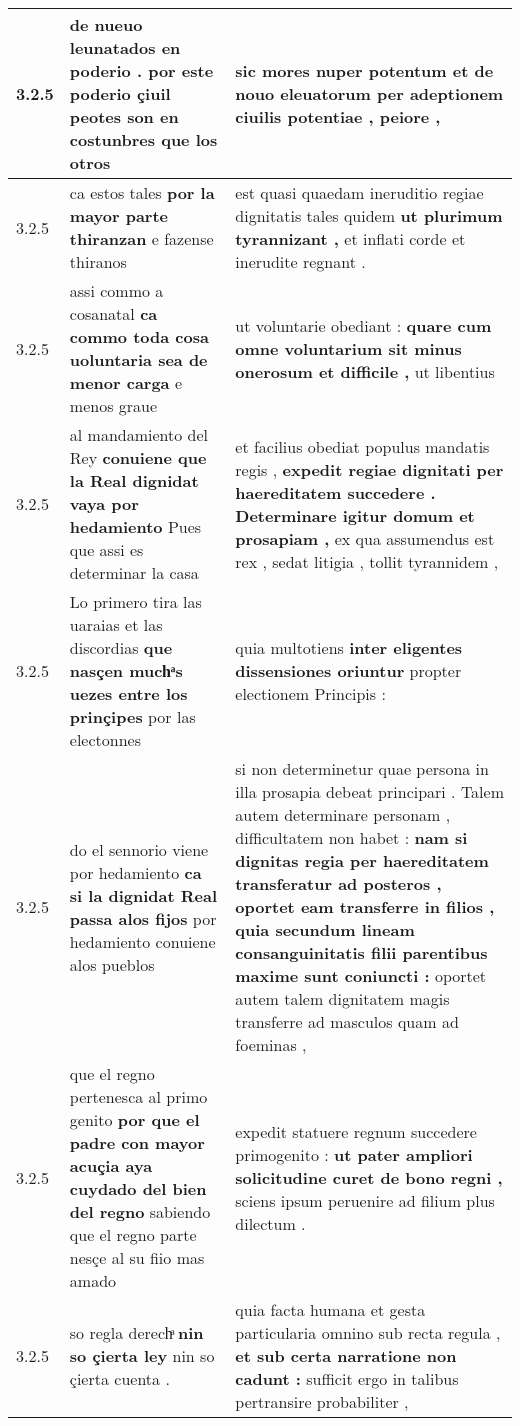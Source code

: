 \begin{tabular}{|p{1cm}|p{6.5cm}|p{6.5cm}|}
3.2.5 & de nueuo leunatados en poderio . \textbf{ por este poderio çiuil peotes son en costunbres } que los otros & sic mores nuper potentum \textbf{ et de nouo eleuatorum per adeptionem ciuilis potentiae , } peiore , \\\hline
3.2.5 & ca estos tales \textbf{ por la mayor parte thiranzan } e fazense thiranos & est quasi quaedam ineruditio regiae dignitatis tales quidem \textbf{ ut plurimum tyrannizant , } et inflati corde et inerudite regnant . \\\hline
3.2.5 & assi commo a cosanatal \textbf{ ca commo toda cosa uoluntaria sea de menor carga } e menos graue & ut voluntarie obediant : \textbf{ quare cum omne voluntarium sit minus onerosum et difficile , } ut libentius \\\hline
3.2.5 & al mandamiento del Rey \textbf{ conuiene que la Real dignidat vaya por hedamiento } Pues que assi es determinar la casa & et facilius obediat populus mandatis regis , \textbf{ expedit regiae dignitati per haereditatem succedere . Determinare igitur domum et prosapiam , } ex qua assumendus est rex , sedat litigia , tollit tyrannidem , \\\hline
3.2.5 & Lo primero tira las uaraias et las discordias \textbf{ que nasçen muchͣs uezes entre los prinçipes } por las electonnes & quia multotiens \textbf{ inter eligentes dissensiones oriuntur } propter electionem Principis : \\\hline
3.2.5 & do el sennorio viene por hedamiento \textbf{ ca si la dignidat Real passa alos fijos } por hedamiento conuiene alos pueblos & si non determinetur quae persona in illa prosapia debeat principari . Talem autem determinare personam , difficultatem non habet : \textbf{ nam si dignitas regia per haereditatem transferatur ad posteros , oportet eam transferre in filios , quia secundum lineam consanguinitatis filii parentibus maxime sunt coniuncti : } oportet autem talem dignitatem magis transferre ad masculos quam ad foeminas , \\\hline
3.2.5 & que el regno pertenesca al primo genito \textbf{ por que el padre con mayor acuçia aya cuydado del bien del regno } sabiendo que el regno parte nesçe al su fiio mas amado & expedit statuere regnum succedere primogenito : \textbf{ ut pater ampliori solicitudine curet de bono regni , } sciens ipsum peruenire ad filium plus dilectum . \\\hline
3.2.5 & so regla derechͣ \textbf{ nin so çierta ley } nin so çierta cuenta . & quia facta humana et gesta particularia omnino sub recta regula , \textbf{ et sub certa narratione non cadunt : } sufficit ergo in talibus pertransire probabiliter , \\\hline

\end{tabular}
